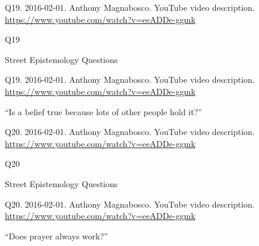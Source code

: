 \documentclass[
    src/templates/5x2-on-a4paper,
    frame
]{flashcards}
\newcommand{\myheader}{}
\newcommand{\myfooter}{
    \begin{flushright}
        \small\sc
        Street Epistemology Questions \par
    \end{flushright}
}
\begin{document}
        \renewcommand{\myheader}{
            \normalfont %
            \begin{tiny}
                Q19.
                2016-02-01.
                Anthony Magnabosco.
                    YouTube video description.
                    \\
                    \url{ https://www.youtube.com/watch?v=eeADDe-ggmk }
                \par
            \end{tiny}
        }
        \begin{flashcard}{
            \myheader
            \vspace{\fill}
            \begin{center}
                \large
                    Q19
            \end{center}
            \vspace{\fill}
            \myfooter
            \vspace{-1.4ex}
        }
            \myheader
            \vspace{\fill}
            \begin{center}
                \large
\enquote{Is a belief true because lots of other people hold it?}            \end{center}
            \vspace{\fill}
        \end{flashcard}
        \renewcommand{\myheader}{
            \normalfont %
            \begin{tiny}
                Q20.
                2016-02-01.
                Anthony Magnabosco.
                    YouTube video description.
                    \\
                    \url{ https://www.youtube.com/watch?v=eeADDe-ggmk }
                \par
            \end{tiny}
        }
        \begin{flashcard}{
            \myheader
            \vspace{\fill}
            \begin{center}
                \large
                    Q20
            \end{center}
            \vspace{\fill}
            \myfooter
            \vspace{-1.4ex}
        }
            \myheader
            \vspace{\fill}
            \begin{center}
                \large
\enquote{Does prayer always work?}            \end{center}
            \vspace{\fill}
        \end{flashcard}
\end{document}
